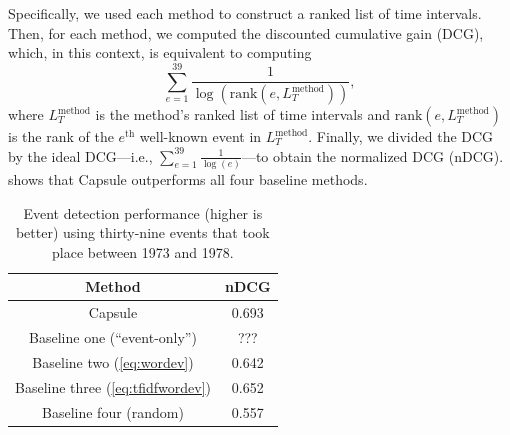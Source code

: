 Specifically, we used each method to construct a ranked list of time
intervals. Then, for each method, we computed the discounted
cumulative gain (DCG), which, in this context, is equivalent to
computing
\begin{equation}
  \sum_{e=1}^{39} \frac{1}{\log{\left(\textrm{rank}\left(e, L_T^{\textrm{method}}\right)\right)}},
\end{equation}
where $L_T^{\textrm{method}}$ is the method's ranked list of time
intervals and $\textrm{rank}\left(e, L_T^{\textrm{method}}\right)$ is
the rank of the $e^{\textrm{th}}$ well-known event in
$L_T^{\textrm{method}}$. Finally, we divided the DCG by the ideal
DCG---i.e., $\sum_{e=1}^{39} \frac{1}{\log{\left(e\right)}}$---to
obtain the normalized DCG (nDCG).  shows that
Capsule outperforms all four baseline methods.

\begin{table}[t]
\centering
\small
\begin{tabular}{cc}
\toprule
\textbf{Method} & \textbf{nDCG} \\
\midrule
Capsule & 0.693 \\
Baseline one (``event-only'') & ???\\
Baseline two (\cref{eq:wordev}) & 0.642 \\
Baseline three (\cref{eq:tfidfwordev}) & 0.652 \\
Baseline four (random) & 0.557\\
\bottomrule
\end{tabular}
\caption{Event detection performance (higher is better) using
  thirty-nine events that took place between 1973 and 1978.}
\label{table:cables:ndcg}
\end{table}


